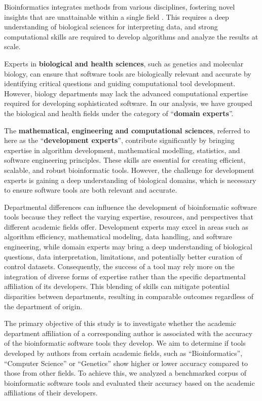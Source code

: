 \documentclass[fleqn,10pt,doc,onecolumn]{SelfArx}%
\begin{document}
Bioinformatics integrates methods from various disciplines, fostering
novel insights that are unattainable within a single field
\cite{mazzocchi2019scientific}. This requires a deep understanding of
biological sciences for interpreting data, and strong computational
skills are required to develop algorithms and analyze the results at
scale.


Experts in \textbf{biological and health sciences}, such as genetics
and molecular biology, can ensure that software tools are biologically
relevant and accurate by identifying critical questions and guiding
computational tool development. However, biology departments may lack
the advanced computational expertise required for developing
sophisticated software. In our analysis, we have grouped the
biological and health fields under the category of ``\textbf{domain
  experts}''.

The \textbf{mathematical, engineering and computational sciences},
referred to here as the ``\textbf{development experts}'', contribute
significantly by bringing expertise in algorithm development,
mathematical modelling, statistics, and software engineering
principles. These skills are essential for creating efficient,
scalable, and robust bioinformatic tools.  However, the challenge for
development experts is gaining a deep understanding of biological domains,
which is necessary to ensure software tools are both relevant
and accurate.

Departmental differences can influence the development of
bioinformatic software tools because they reflect the varying
expertise, resources, and perspectives that different academic fields
offer. Development experts may excel in areas such as algorithm
efficiency, mathematical modeling, data handling, and software
engineering, while domain experts may bring a deep understanding of
biological questions, data interpretation, limitations, and
potentially better curation of control datasets. Consequently, the
success of a tool may rely more on the integration of diverse
forms of expertise rather than the specific departmental affiliation
of its developers. This blending of skills can mitigate potential
disparities between departments, resulting in comparable outcomes
regardless of the department of origin.


The primary objective of this study is to investigate whether the
academic department affiliation of a corresponding author is
associated with the accuracy of the bioinformatic software tools they
develop. We aim to determine if tools developed by authors from
certain academic fields, such as ``Bioinformatics'', ``Computer
Science'' or ``Genetics'' show higher or lower accuracy compared to
those from other fields. To achieve this, we analyzed a benchmarked
corpus of bioinformatic software tools and evaluated their accuracy
based on the academic affiliations of their developers.
\end{document}
